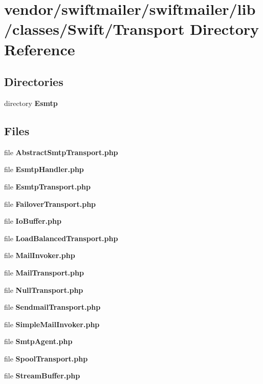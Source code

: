 \section{vendor/swiftmailer/swiftmailer/lib/classes/\+Swift/\+Transport Directory Reference}
\label{dir_e746866eba1e6a482d817e4dbcd196a3}
\subsection*{Directories}
\begin{DoxyCompactItemize}
\item 
directory {\bf Esmtp}
\end{DoxyCompactItemize}
\subsection*{Files}
\begin{DoxyCompactItemize}
\item 
file {\bf Abstract\+Smtp\+Transport.\+php}
\item 
file {\bf Esmtp\+Handler.\+php}
\item 
file {\bf Esmtp\+Transport.\+php}
\item 
file {\bf Failover\+Transport.\+php}
\item 
file {\bf Io\+Buffer.\+php}
\item 
file {\bf Load\+Balanced\+Transport.\+php}
\item 
file {\bf Mail\+Invoker.\+php}
\item 
file {\bf Mail\+Transport.\+php}
\item 
file {\bf Null\+Transport.\+php}
\item 
file {\bf Sendmail\+Transport.\+php}
\item 
file {\bf Simple\+Mail\+Invoker.\+php}
\item 
file {\bf Smtp\+Agent.\+php}
\item 
file {\bf Spool\+Transport.\+php}
\item 
file {\bf Stream\+Buffer.\+php}
\end{DoxyCompactItemize}

